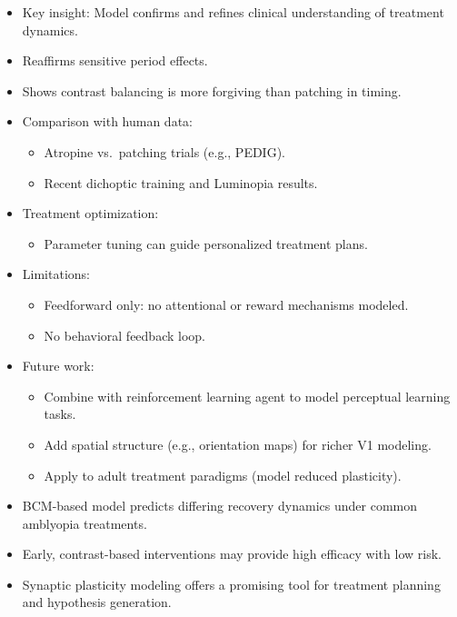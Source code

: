 \documentclass[
]{article}
\providecommand{\tightlist}{%
  \setlength{\itemsep}{0pt}\setlength{\parskip}{0pt}}
\begin{document}
\begin{itemize}
\tightlist
\item[$\square$]
  Key insight: Model confirms and refines clinical understanding of
  treatment dynamics.
\item[$\square$]
  Reaffirms sensitive period effects.
\item[$\square$]
  Shows contrast balancing is more forgiving than patching in timing.
\item[$\square$]
  Comparison with human data:

  \begin{itemize}
  \tightlist
  \item[$\square$]
    Atropine vs.~patching trials (e.g., PEDIG).
  \item[$\square$]
    Recent dichoptic training and Luminopia results.
  \end{itemize}
\item[$\square$]
  Treatment optimization:

  \begin{itemize}
  \tightlist
  \item[$\square$]
    Parameter tuning can guide personalized treatment plans.
  \end{itemize}
\item[$\square$]
  Limitations:

  \begin{itemize}
  \tightlist
  \item[$\square$]
    Feedforward only: no attentional or reward mechanisms modeled.
  \item[$\square$]
    No behavioral feedback loop.
  \end{itemize}
\item[$\square$]
  Future work:

  \begin{itemize}
  \tightlist
  \item[$\square$]
    Combine with reinforcement learning agent to model perceptual
    learning tasks.
  \item[$\square$]
    Add spatial structure (e.g., orientation maps) for richer V1
    modeling.
  \item[$\square$]
    Apply to adult treatment paradigms (model reduced plasticity).
  \end{itemize}
\item[$\square$]
  BCM-based model predicts differing recovery dynamics under common
  amblyopia treatments.
\item[$\square$]
  Early, contrast-based interventions may provide high efficacy with low
  risk.
\item[$\square$]
  Synaptic plasticity modeling offers a promising tool for treatment
  planning and hypothesis generation.
\end{itemize}
\end{document}
